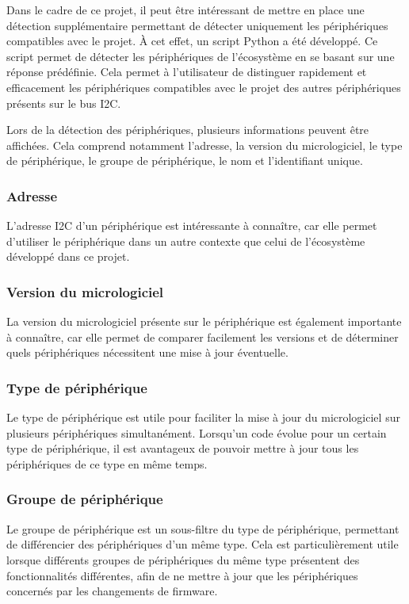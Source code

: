 Dans le cadre de ce projet, il peut être intéressant de mettre en place une détection supplémentaire permettant de détecter uniquement les périphériques compatibles avec le projet.
À cet effet, un script Python a été développé.
Ce script permet de détecter les périphériques de l'écosystème en se basant sur une réponse prédéfinie.
Cela permet à l'utilisateur de distinguer rapidement et efficacement les périphériques compatibles avec le projet des autres périphériques présents sur le bus I2C.

Lors de la détection des périphériques, plusieurs informations peuvent être affichées.
Cela comprend notamment l'adresse, la version du micrologiciel, le type de périphérique, le groupe de périphérique, le nom et l'identifiant unique.

\subsubsection{Adresse}

L'adresse I2C d'un périphérique est intéressante à connaître, car elle permet d'utiliser le périphérique dans un autre contexte que celui de l'écosystème développé dans ce projet.

\subsubsection{Version du micrologiciel}

La version du micrologiciel présente sur le périphérique est également importante à connaître, car elle permet de comparer facilement les versions et de déterminer quels périphériques nécessitent une mise à jour éventuelle.

\subsubsection{Type de périphérique}

Le type de périphérique est utile pour faciliter la mise à jour du micrologiciel sur plusieurs périphériques simultanément.
Lorsqu'un code évolue pour un certain type de périphérique, il est avantageux de pouvoir mettre à jour tous les périphériques de ce type en même temps.

\subsubsection{Groupe de périphérique}

Le groupe de périphérique est un sous-filtre du type de périphérique, permettant de différencier des périphériques d'un même type.
Cela est particulièrement utile lorsque différents groupes de périphériques du même type présentent des fonctionnalités différentes, afin de ne mettre à jour que les périphériques concernés par les changements de firmware.

